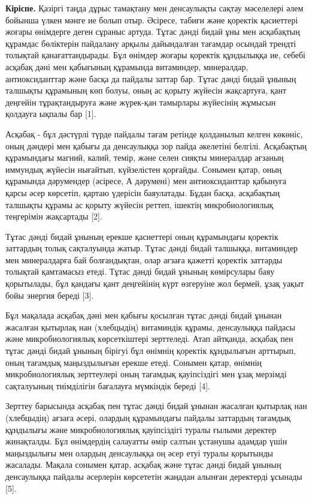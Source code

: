 \begin{multicols}{2}
{\bfseries Кіріспе.} Қазіргі таңда дұрыс тамақтану мен денсаулықты
сақтау мәселелері әлем бойынша үлкен мәнге ие болып отыр. Әсіресе,
табиғи және қоректік қасиеттері жоғары өнімдерге деген сұраныс артуда.
Тұтас дәнді бидай ұны мен асқабақтың құрамдас бөліктерін пайдалану
арқылы дайындалған тағамдар осындай трендті толықтай қанағаттандырады.
Бұл өнімдер жоғары қоректік құндылыққа ие, себебі асқабақ дәні мен
қабығының құрамында витаминдер, минералдар, антиоксиданттар және басқа
да пайдалы заттар бар. Тұтас дәнді бидай ұнының талшықты құрамының көп
болуы, оның ас қорыту жүйесін жақсартуға, қант деңгейін тұрақтандыруға
және жүрек-қан тамырлары жүйесінің жұмысын қолдауға ықпалы бар {[}1{]}.

Асқабақ - бұл дәстүрлі түрде пайдалы тағам ретінде қолданылып келген
көкөніс, оның дәндері мен қабығы да денсаулыққа зор пайда әкелетіні
белгілі. Асқабақтың құрамындағы магний, калий, темір, және селен сияқты
минералдар ағзаның иммундық жүйесін нығайтып, күйзелістен қорғайды.
Сонымен қатар, оның құрамында дәрумендер (әсіресе, А дәрумені) мен
антиоксиданттар қабынуға қарсы әсер көрсетіп, қартаю үдерісін
баяулатады. Бұдан басқа, асқабақтың талшықты құрамы ас қорыту жүйесін
реттеп, ішектің микробиологиялық теңгерімін жақсартады {[}2{]}.

Тұтас дәнді бидай ұнының ерекше қасиеттері оның құрамындағы қоректік
заттардың толық сақталуында жатыр. Тұтас дәнді бидай талшыққа,
витаминдер мен минералдарға бай болғандықтан, олар ағзаға қажетті
қоректік заттарды толықтай қамтамасыз етеді. Тұтас дәнді бидай ұнының
көмірсулары баяу қорытылады, бұл қандағы қант деңгейінің күрт өзгеруіне
жол бермей, ұзақ уақыт бойы энергия береді {[}3{]}.

Бұл мақалада асқабақ дәні мен қабығы қосылған тұтас дәнді бидай ұнынан
жасалған қытырлақ нан (хлебцыдің) витаминдік құрамы, денсаулыққа пайдасы
және микробиологиялық көрсеткіштері зерттеледі. Атап айтқанда, асқабақ
пен тұтас дәнді бидай ұнының бірігуі бұл өнімнің қоректік құндылығын
арттырып, оның тағамдық маңыздылығын ерекше етеді. Сонымен қатар,
өнімнің микробиологиялық зерттеулері оның тағамдық қауіпсіздігі мен ұзақ
мерзімді сақталуының тиімділігін бағалауға мүмкіндік береді {[}4{]}.

Зерттеу барысында асқабақ пен тұтас дәнді бидай ұнынан жасалған қытырлақ
нан (хлебцыдің) ағзаға әсері, олардың құрамындағы пайдалы заттардың
тағамдық құндылығы және микробиологиялық қауіпсіздігі туралы ғылыми
деректер жинақталды. Бұл өнімдердің салауатты өмір салтын ұстанушы
адамдар үшін маңыздылығы мен олардың денсаулыққа оң әсер етуі туралы
қорытынды жасалады. Мақала сонымен қатар, асқабақ және тұтас дәнді бидай
ұнының денсаулыққа пайдалы әсерлерін көрсететін жаңадан алынған
деректерді ұсынады {[}5{]}.


\end{multicols}
